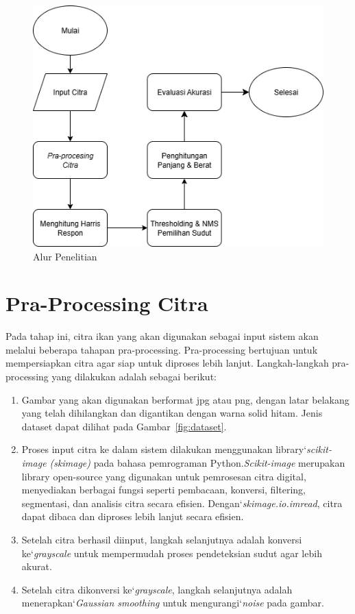 \begin{figure}
    \centering
    \includegraphics[scale= 0.7]{gambar/Alur Penelitian.png}
    \caption{Alur Penelitian}\label{Alur Penelitian}
\end{figure}

\section{Pra-Processing Citra}
    Pada tahap ini, citra ikan yang akan digunakan sebagai input sistem akan melalui beberapa tahapan pra-processing.
Pra-processing bertujuan untuk mempersiapkan citra agar siap untuk diproses lebih lanjut. Langkah-langkah pra-processing yang dilakukan adalah sebagai berikut:
\begin{enumerate}
    \item Gambar yang akan digunakan berformat jpg atau png, dengan latar belakang yang telah dihilangkan dan digantikan dengan warna solid hitam.  Jenis dataset dapat dilihat pada Gambar~\ref{fig:dataset}.
    \item Proses input citra ke dalam sistem dilakukan menggunakan library`\emph{scikit-image (skimage)} pada bahasa pemrograman Python.\emph{Scikit-image} merupakan library open-source yang digunakan untuk pemrosesan citra digital, menyediakan berbagai fungsi seperti pembacaan, konversi, filtering, segmentasi, dan analisis citra secara efisien. Dengan`\emph{skimage.io.imread}, citra dapat dibaca dan diproses lebih lanjut secara efisien.
    \item Setelah citra berhasil diinput, langkah selanjutnya adalah konversi ke`\emph{grayscale} untuk mempermudah proses pendeteksian sudut agar lebih akurat.
    \item Setelah citra dikonversi ke`\emph{grayscale}, langkah selanjutnya adalah menerapkan`\emph{Gaussian smoothing} untuk mengurangi`\emph{noise} pada gambar.
\end{enumerate}

